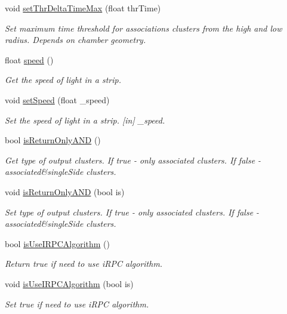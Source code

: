 \begin{DoxyCompactItemize}
void \hyperlink{classiRPCInfo_ab42a24a72e31cabc5eac0ec236005ea1}{set\-Thr\-Delta\-Time\-Max} (float thr\-Time)
\begin{DoxyCompactList}\small\item\em Set maximum time threshold for associations clusters from the high and low radius. Depends on chamber geometry. \end{DoxyCompactList}\item 
float \hyperlink{classiRPCInfo_af88bf411e22cfa4088b175dc0462c6be}{speed} ()
\begin{DoxyCompactList}\small\item\em Get the speed of light in a strip. \end{DoxyCompactList}\item 
\hypertarget{classiRPCInfo_aa13ce2c293d20669c7672e2ca31e77ec}{void \hyperlink{classiRPCInfo_aa13ce2c293d20669c7672e2ca31e77ec}{set\-Speed} (float \-\_\-speed)}\label{classiRPCInfo_aa13ce2c293d20669c7672e2ca31e77ec}

\begin{DoxyCompactList}\small\item\em Set the speed of light in a strip. \mbox{[}in\mbox{]} \-\_\-speed. \end{DoxyCompactList}\item 
bool \hyperlink{classiRPCInfo_a1489a6d0d33c5aeda19133910ff76f60}{is\-Return\-Only\-A\-N\-D} ()
\begin{DoxyCompactList}\small\item\em Get type of output clusters. If true -\/ only associated clusters. If false -\/ associated\&single\-Side clusters. \end{DoxyCompactList}\item 
void \hyperlink{classiRPCInfo_a2a7db44337819ac3ccb6790c9c4156b3}{is\-Return\-Only\-A\-N\-D} (bool is)
\begin{DoxyCompactList}\small\item\em Set type of output clusters. If true -\/ only associated clusters. If false -\/ associated\&single\-Side clusters. \end{DoxyCompactList}\item 
bool \hyperlink{classiRPCInfo_a4cca07cee2a8d029a081c027a186b159}{is\-Use\-I\-R\-P\-C\-Algorithm} ()
\begin{DoxyCompactList}\small\item\em Return true if need to use i\-R\-P\-C algorithm. \end{DoxyCompactList}\item 
void \hyperlink{classiRPCInfo_a222b4a3789086727845749f80bb58347}{is\-Use\-I\-R\-P\-C\-Algorithm} (bool is)
\begin{DoxyCompactList}\small\item\em Set true if need to use i\-R\-P\-C algorithm. \end{DoxyCompactList}\end{DoxyCompactItemize}


